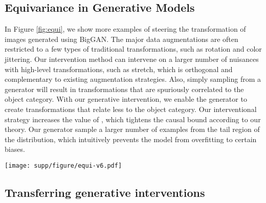 \documentclass[final]{cvpr}
\begin{document}
\begin{subappendices}
\subsection{Equivariance in Generative Models}

In Figure \ref{fig:equi}, we show more examples of steering the transformation of images generated using BigGAN. The major data augmentations are often restricted to a few types of traditional transformations, such as rotation and color jittering. Our intervention method can intervene on a larger number of nuisances with high-level transformations, such as stretch, which is orthogonal and complementary to existing augmentation strategies. Also, simply sampling from a generator will result in transformations that are spuriously correlated to the object category. With our generative intervention, we enable the generator to create transformations that relate less to the object category. Our interventional strategy increases the value of , which tightens the causal bound according to our theory.
Our generator sample a larger number of examples from the tail region of the distribution, which intuitively prevents the model from overfitting to certain biases.

\begin{figure*}
  \centering
\texttt{[image: supp/figure/equi-v6.pdf]}
  \vspace{-5mm}
  \caption{Generative adversarial networks are steerable, allowing us to manipulate images and approximate interventions. Since the representations are equivariant, the transformations transfer across categories. Each row in the figure presents images from the same intervention direction. }
\label{fig:equi}
\end{figure*}


\subsection{Transferring generative interventions}


\end{subappendices}
\end{document}
